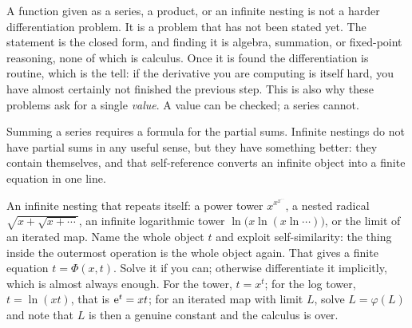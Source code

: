 \begin{keynote}
A function given as a series, a product, or an infinite nesting is not a harder differentiation problem. It is a problem that has not been stated yet. The statement is the closed form, and finding it is algebra, summation, or fixed-point reasoning, none of which is calculus. Once it is found the differentiation is routine, which is the tell: if the derivative you are computing is itself hard, you have almost certainly not finished the previous step. This is also why these problems ask for a single \emph{value}. A value can be checked; a series cannot.
\end{keynote}

Summing a series requires a formula for the partial sums. Infinite nestings do not have partial sums in any useful sense, but they have something better: they contain themselves, and that self-reference converts an infinite object into a finite equation in one line.

\cue An infinite nesting that repeats itself: a power tower $x^{x^{x^{\cdots}}}$, a nested radical $\sqrt{x+\sqrt{x+\cdots}}$, an infinite logarithmic tower $\ln\bigl(x\ln(x\ln\cdots)\bigr)$, or the limit of an iterated map.
\method Name the whole object $t$ and exploit self-similarity: the thing inside the outermost operation is the whole object again. That gives a finite equation $t=\Phi(x,t)$. Solve it if you can; otherwise differentiate it implicitly, which is almost always enough. For the tower, $t=x^{t}$; for the log tower, $t=\ln(xt)$, that is $\mathrm{e}^{t}=xt$; for an iterated map with limit $L$, solve $L=\varphi(L)$ and note that $L$ is then a genuine constant and the calculus is over.

